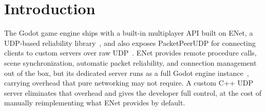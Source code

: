\IfFileExists{IEEEtran.cls}{\ieeetrue\documentclass[conference]{IEEEtran}}{\ieeefalse\documentclass[twocolumn,10pt]{article}}
\begin{document}
\section{Introduction}
The Godot game engine ships with a built-in multiplayer API built on ENet, a UDP-based reliability library~\cite{aukstakalnis2024}, and also exposes PacketPeerUDP for connecting clients to custom servers over raw UDP~\cite{godotudp}. ENet provides remote procedure calls, scene synchronization, automatic packet reliability, and connection management out of the box, but its dedicated server runs as a full Godot engine instance~\cite{godotdedicated}, carrying overhead that pure networking may not require. A custom C++ UDP server eliminates that overhead and gives the developer full control, at the cost of manually reimplementing what ENet provides by default.
\end{document}
